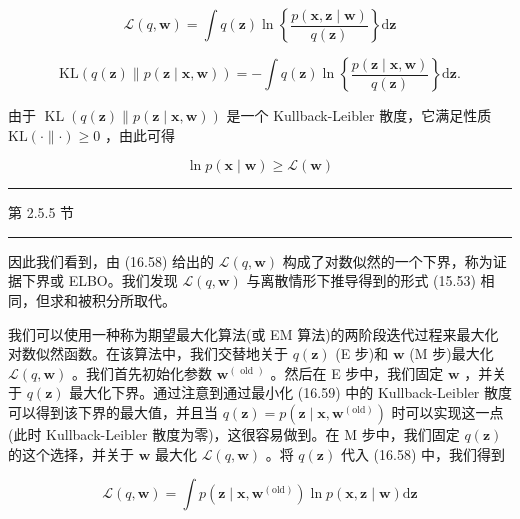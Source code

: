 \documentclass[10pt]{article}
\newcommand{\HRule}{\begin{center}\rule{0.9\linewidth}{0.2mm}\end{center}}
\begin{document}
\[
\mathcal{L}\left( {q,\mathbf{w}}\right)  = \int q\left( \mathbf{z}\right) \ln \left\{  \frac{p\left( {\mathbf{x},\mathbf{z} \mid  \mathbf{w}}\right) }{q\left( \mathbf{z}\right) }\right\}  \mathrm{d}\mathbf{z} \tag{16.58}
\]

\[
\mathrm{{KL}}\left( {q\left( \mathbf{z}\right) \parallel p\left( {\mathbf{z} \mid  \mathbf{x},\mathbf{w}}\right) }\right)  =  - \int q\left( \mathbf{z}\right) \ln \left\{  \frac{p\left( {\mathbf{z} \mid  \mathbf{x},\mathbf{w}}\right) }{q\left( \mathbf{z}\right) }\right\}  \mathrm{d}\mathbf{z}. \tag{16.59}
\]

由于 \(\operatorname{KL}\left( {q\left( \mathbf{z}\right) \parallel p\left( {\mathbf{z} \mid  \mathbf{x},\mathbf{w}}\right) }\right)\) 是一个 Kullback-Leibler 散度，它满足性质 \(\mathrm{{KL}}\left( {\cdot \parallel  \cdot  }\right)  \geq  0\) ，由此可得

\[
\ln p\left( {\mathbf{x} \mid  \mathbf{w}}\right)  \geq  \mathcal{L}\left( \mathbf{w}\right)  \tag{16.60}
\]

\HRule

第 2.5.5 节

\HRule

因此我们看到，由 (16.58) 给出的 \(\mathcal{L}\left( {q,\mathbf{w}}\right)\) 构成了对数似然的一个下界，称为证据下界或 ELBO。我们发现 \(\mathcal{L}\left( {q,\mathbf{w}}\right)\) 与离散情形下推导得到的形式 (15.53) 相同，但求和被积分所取代。

我们可以使用一种称为期望最大化算法(或 EM 算法)的两阶段迭代过程来最大化对数似然函数。在该算法中，我们交替地关于 \(q\left( \mathbf{z}\right)\) (E 步)和 \(\mathbf{w}\) (M 步)最大化 \(\mathcal{L}\left( {q,\mathbf{w}}\right)\) 。我们首先初始化参数 \({\mathbf{w}}^{\left( \text{ old }\right) }\) 。然后在 E 步中，我们固定 \(\mathbf{w}\) ，并关于 \(q\left( \mathbf{z}\right)\) 最大化下界。通过注意到通过最小化 (16.59) 中的 Kullback-Leibler 散度可以得到该下界的最大值，并且当 \(q\left( \mathbf{z}\right)  = p\left( {\mathbf{z} \mid  \mathbf{x},{\mathbf{w}}^{\left( \mathrm{{old}}\right) }}\right)\) 时可以实现这一点(此时 Kullback-Leibler 散度为零)，这很容易做到。在 M 步中，我们固定 \(q\left( \mathbf{z}\right)\) 的这个选择，并关于 \(\mathbf{w}\) 最大化 \(\mathcal{L}\left( {q,\mathbf{w}}\right)\) 。将 \(q\left( \mathbf{z}\right)\) 代入 (16.58) 中，我们得到

\[
\mathcal{L}\left( {q,\mathbf{w}}\right)  = \int p\left( {\mathbf{z} \mid  \mathbf{x},{\mathbf{w}}^{\left( \mathrm{{old}}\right) }}\right) \ln p\left( {\mathbf{x},\mathbf{z} \mid  \mathbf{w}}\right) \mathrm{d}\mathbf{z}
\]
\end{document}
